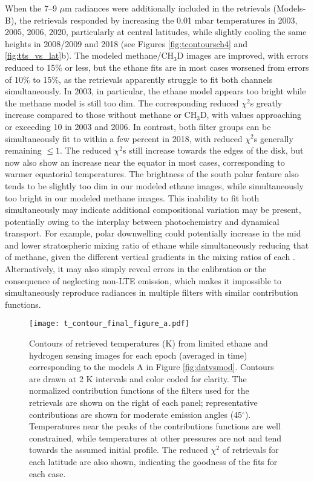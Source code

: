 \documentclass[twocolumn,10pt]{aastex631}
\begin{document}
When the 7--9 $\mu$m radiances were additionally included in the retrievals (Models-B), the retrievals responded by increasing the 0.01 mbar temperatures in 2003, 2005, 2006, 2020, particularly at central latitudes, while slightly cooling the same heights in 2008/2009 and 2018 (see Figures \ref{fig:tcontoursch4} and \ref{fig:tts_vs_lat}b). The modeled methane/CH$_3$D images are improved, with errors reduced to 15$\%$ or less, but the ethane fits are in most cases worsened from errors of 10$\%$ to 15$\%$, as the retrievals apparently struggle to fit both channels simultaneously. In 2003, in particular, the ethane model appears too bright while the methane model is still too dim. The corresponding reduced $\chi^2$s greatly increase compared to those without methane or CH$_3$D, with values approaching or exceeding 10 in 2003 and 2006.  In contrast, both filter groups can be simultaneously fit to within a few percent in 2018, with reduced $\chi^2$s generally remaining $\le 1$. The reduced $\chi^2$s still increase towards the edges of the disk, but now also show an increase near the equator in most cases, corresponding to warmer equatorial temperatures. The brightness of the south polar feature also tends to be slightly too dim in our modeled ethane images, while simultaneously too bright in our modeled methane images. This inability to fit both simultaneously may indicate additional compositional variation may be present, potentially owing to the interplay between photochemistry and dynamical transport. For example, polar downwelling could potentially increase in the mid and lower stratospheric mixing ratio of ethane while simultaneously reducing that of methane, given the different vertical gradients in the mixing ratios of each \citep[i.e. ethane increases with height, methane does not;][]{moses2005photochemistry, moses2018seasonal}. Alternatively, it may also simply reveal errors in the calibration or the consequence of neglecting non-LTE emission, which makes it impossible to simultaneously reproduce radiances in multiple filters with similar contribution functions. 

\begin{figure*}[h]
    \centering
    \texttt{[image: t\_contour\_final\_figure\_a.pdf]}
    \caption{Contours of retrieved temperatures (K) from limited ethane and hydrogen sensing images for each epoch (averaged in time) corresponding to the models A in Figure \ref{fig:datvsmod}. Contours are drawn at 2 K intervals and color coded for clarity. The normalized contribution functions of the filters used for the retrievals are shown on the right of each panel; representative contributions are shown for moderate emission angles (45$^{\circ}$). Temperatures near the peaks of the contributions functions are well constrained, while temperatures at other pressures are not and tend towards the assumed initial profile. The reduced $\chi^2$ of retrievals for each latitude are also shown, indicating the goodness of the fits for each case.}
    \label{fig:tcountours} 
\end{figure*}
\end{document}
